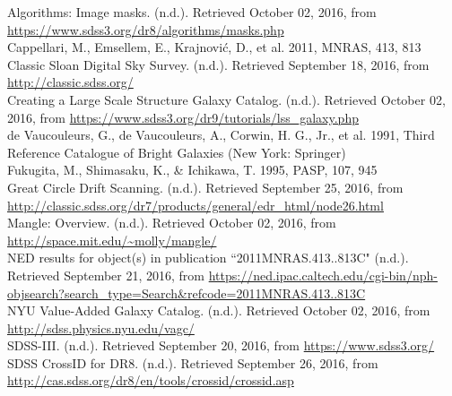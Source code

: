 \documentclass[10pt,letterpaper]{article}
\begin{document}
\newpage
\center
\begin{thebibliography}{1}
 Algorithms: Image masks. (n.d.). Retrieved October 02, 2016, from \url{https://www.sdss3.org/dr8/algorithms/masks.php}\\

 Cappellari, M., Emsellem, E., Krajnovi\'c, D., et al. 2011, MNRAS, 413, 813\\

 Classic Sloan Digital Sky Survey. (n.d.). Retrieved September 18, 2016, from \url{http://classic.sdss.org/}\\

 Creating a Large Scale Structure Galaxy Catalog. (n.d.). Retrieved October 02, 2016, from \url{https://www.sdss3.org/dr9/tutorials/lss_galaxy.php}\\

 de Vaucouleurs, G., de Vaucouleurs, A., Corwin, H. G., Jr., et al. 1991, Third
Reference Catalogue of Bright Galaxies (New York: Springer)\\

 Fukugita, M., Shimasaku, K., \& Ichikawa, T. 1995, PASP, 107, 945\\

 Great Circle Drift Scanning. (n.d.). Retrieved September 25, 2016, from \url{http://classic.sdss.org/dr7/products/general/edr_html/node26.html}\\

 Mangle: Overview. (n.d.). Retrieved October 02, 2016, from \url{http://space.mit.edu/~molly/mangle/}\\

 NED results for object(s) in publication ``2011MNRAS.413..813C" (n.d.). Retrieved September 21, 2016, from \url{https://ned.ipac.caltech.edu/cgi-bin/nph-objsearch?search_type=Search&refcode=2011MNRAS.413..813C}\\

 NYU Value-Added Galaxy Catalog. (n.d.). Retrieved October 02, 2016, from \url{http://sdss.physics.nyu.edu/vagc/}\\

 SDSS-III. (n.d.). Retrieved September 20, 2016, from \url{https://www.sdss3.org/}\\

 SDSS CrossID for DR8. (n.d.). Retrieved September 26, 2016, from \url{http://cas.sdss.org/dr8/en/tools/crossid/crossid.asp}\\


\end{thebibliography}
\end{document}
